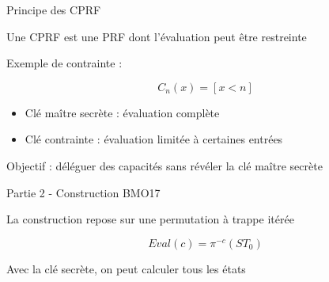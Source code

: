\documentclass{beamer}
\begin{document}
\begin{frame}{Principe des CPRF}

Une CPRF est une PRF dont l'évaluation peut être restreinte

\vspace{0.4cm}

Exemple de contrainte :

\[
C_n(x) = [x < n]
\]

\vspace{0.4cm}

\begin{itemize}
    \item Clé maître secrète : évaluation complète
    \item Clé contrainte : évaluation limitée à certaines entrées
\end{itemize}

\vspace{0.5cm}

Objectif :
déléguer des capacités sans révéler la clé maître secrète
\end{frame}

\begin{frame}{Partie 2 - Construction BMO17}

La construction repose sur une permutation à trappe itérée

\vspace{0.5cm}

\begin{center}
\end{center}

\vspace{0.5cm}

\[
\mathit{Eval}(c) = \pi^{-c}(ST_0)
\]

Avec la clé secrète, on peut calculer tous les états
\end{frame}
\end{document}
